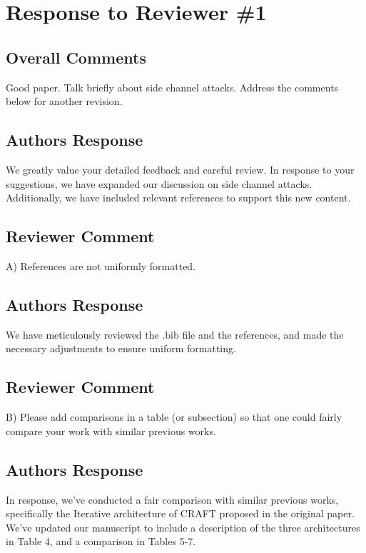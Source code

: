 \section{Response to Reviewer \#1}
\subsection*{Overall Comments}
Good paper. Talk briefly about side channel attacks. Address the comments below for another revision.

\subsection{Authors Response}

We greatly value your detailed feedback and careful review. In response to your suggestions, we have expanded our discussion on side channel attacks. Additionally, we have included relevant references to support this new content.

\subsection{Reviewer Comment}

A) References are not uniformly formatted.

\subsection{Authors Response}
We have meticulously reviewed the .bib file and the references, and made the necessary adjustments to ensure uniform formatting.


\subsection{Reviewer Comment}
 B) Please add comparisons in a table (or subsection) so that one could fairly compare your work with similar previous works.

\subsection{Authors Response}

In response, we've conducted a fair comparison with similar previous works, specifically the Iterative architecture of CRAFT proposed in the original paper. We've updated our manuscript to include a description of the three architectures in Table 4, and a comparison in Tables 5-7.




